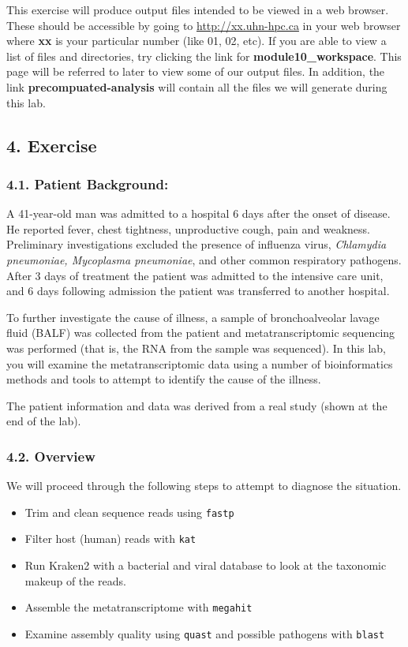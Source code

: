 \documentclass[
]{book}
\providecommand{\tightlist}{%
  \setlength{\itemsep}{0pt}\setlength{\parskip}{0pt}}
\begin{document}
This exercise will produce output files intended to be viewed in a web browser. These should be accessible by going to \url{http://xx.uhn-hpc.ca} in your web browser where \textbf{xx} is your particular number (like 01, 02, etc). If you are able to view a list of files and directories, try clicking the link for \textbf{module10\_workspace}. This page will be referred to later to view some of our output files. In addition, the link \textbf{precompuated-analysis} will contain all the files we will generate during this lab.

\subsection{4. Exercise}\label{exercise}

\subsubsection{4.1. Patient Background:}\label{patient-background}

A 41-year-old man was admitted to a hospital 6 days after the onset of disease. He reported fever, chest tightness, unproductive cough, pain and weakness. Preliminary investigations excluded the presence of influenza virus, \emph{Chlamydia pneumoniae, Mycoplasma pneumoniae}, and other common respiratory pathogens. After 3 days of treatment the patient was admitted to the intensive care unit, and 6 days following admission the patient was transferred to another hospital.

To further investigate the cause of illness, a sample of bronchoalveolar lavage fluid (BALF) was collected from the patient and metatranscriptomic sequencing was performed (that is, the RNA from the sample was sequenced). In this lab, you will examine the metatranscriptomic data using a number of bioinformatics methods and tools to attempt to identify the cause of the illness.

The patient information and data was derived from a real study (shown at the end of the lab).

\subsubsection{4.2. Overview}\label{overview}

We will proceed through the following steps to attempt to diagnose the situation.

\begin{itemize}
\tightlist
\item
  Trim and clean sequence reads using \texttt{fastp}
\item
  Filter host (human) reads with \texttt{kat}
\item
  Run Kraken2 with a bacterial and viral database to look at the taxonomic makeup of the reads.
\item
  Assemble the metatranscriptome with \texttt{megahit}
\item
  Examine assembly quality using \texttt{quast} and possible pathogens with \texttt{blast}
\end{itemize}
\end{document}
